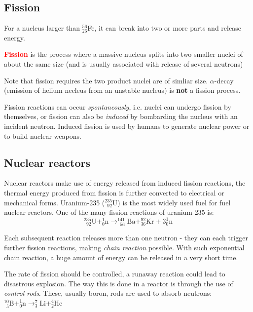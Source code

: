 \documentclass[a4paper,12pt]{book}
\newcommand{\piste}{{\fontencoding{U}\fontfamily{futs}\selectfont\char 49\relax}}
\newenvironment{ilight}
  {\centering
  	\vspace*{6pt}
  	\begin{tcolorbox}[colframe=Gray,colback=LightGrey!15]
  \setlength{\baselineskip}{\baselineskip}%
  }
  {\end{tcolorbox}\vspace*{-4pt}}
\newcommand{\keypoint}[1]{\textbf{\textcolor{red}{#1}}}
\newcommand{\piste}{\textsuperscript{$\star$}}
\newcommand{\keypoint}[1]{\textbf{\textcolor{red}{#1}}}
\begin{document}
\subsection{Fission}

For a nucleus larger than $^{56}_{26}$Fe, it can break into two or more parts and release energy.

\begin{ilight}
	\keypoint{Fission} is the process where a massive nucleus splits into two smaller nuclei of about the same size (and is usually associated with release of several neutrons)
\end{ilight}

Note that fission requires the two product nuclei are of simliar size. $\alpha$-decay (emission of helium necleus from an unstable nucleus) is \textbf{not} a fission process.

Fission reactions can occur \emph{spontaneously}, i.e. nuclei can undergo fission by themselves, or fission can also be \emph{induced} by bombarding the nucleus with an incident neutron. Induced fission is used by humans to generate nuclear power or to build nuclear weapons.

\subsection*{Nuclear reactors \piste}

Nuclear reactors make use of energy released from induced fission reactions, the thermal energy produced from fission is further converted to electrical or mechanical forms. Uranium-235 ($^{235}_{\phantom{1}92}\text{U}$) is the most widely used fuel for fuel nuclear reactors. 
One of the many fission reactions of uranium-235 is: $$^{235}_{\phantom{1}92}\text{U} + ^1_0\text{n} \longrightarrow  ^{141}_{\phantom{1}56}\text{Ba} + ^{92}_{36}\text{Kr} + 3^1_0\text{n}$$

Each subsequent reaction releases more than one neutron - they can each trigger further fission reactions, making \emph{chain reaction} possible. With such exponential chain reaction, a huge amount of energy can be released in a very short time.

The rate of fission should be controlled, a runaway reaction could lead to disastrous explosion. The way this is done in a reactor is through the use of \emph{control rods}. These, usually boron, rods are used to absorb neutrons: $^{10}_{\phantom{1}5}\text{B} + ^1_0\text{n} \longrightarrow  ^{7}_{3}\text{Li} + ^{4}_{2}\text{He}$
\end{document}
